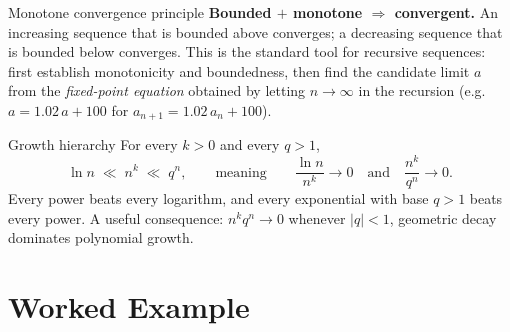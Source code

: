\begin{rulebox}{Monotone convergence principle}
\textbf{Bounded $+$ monotone $\Rightarrow$ convergent.} An increasing
sequence that is bounded above converges; a decreasing sequence that is
bounded below converges. This is the standard tool for recursive sequences:
first establish monotonicity and boundedness, then find the candidate
limit $a$ from the \emph{fixed-point equation} obtained by letting
$n\to\infty$ in the recursion (e.g.\ $a=1.02\,a+100$ for
$a_{n+1}=1.02\,a_{n}+100$).
\end{rulebox}

\begin{rulebox}{Growth hierarchy}
For every $k>0$ and every $q>1$,
\[
  \ln n \;\ll\; n^{k} \;\ll\; q^{n},
  \qquad\text{meaning}\qquad
  \frac{\ln n}{n^{k}}\to 0
  \quad\text{and}\quad
  \frac{n^{k}}{q^{n}}\to 0 .
\]
Every power beats every logarithm, and every exponential with base $q>1$
beats every power. A useful consequence: $n^{k}q^{n}\to 0$ whenever
$|q|<1$, geometric decay dominates polynomial growth.
\end{rulebox}

\section{Worked Example}


